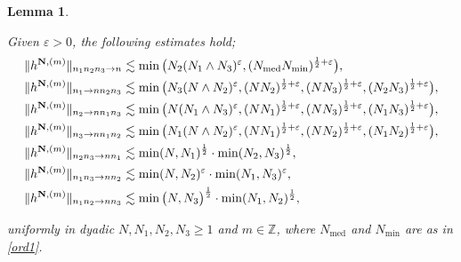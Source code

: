 \documentclass[%
11pt,  reqno]{amsart}
\newtheorem{lemma}[theorem]{Lemma}
\DeclareMathOperator{\med}{med}
\newcommand{\1}{\hspace{0.2mm}\text{I}\hspace{0.2mm}}
\newcommand{\noi}{\noindent}
\newcommand{\Z}{\mathbb{Z}}
\newcommand{\eps}{\varepsilon}
\numberwithin{equation}{section}
\numberwithin{theorem}{section}
\begin{document}
\begin{lemma}
\label{LEM:basetensor}



Given $\eps > 0$, the following estimates hold\textup{;}
\begin{align}
\|h^{{\bf N},(m)} \|_{n_1 n_2 n_3 \to n} &\lesssim  \min \big(N_2 (N_1\wedge N_3)^{\eps}, (N_{\med}N_{\min})^{\frac12 +\eps}\big), 
\notag \\
\|h^{{\bf N},(m)} \|_{n_1 \to n n_2n_3  } 
&\lesssim  \min \big(N_3 (N\wedge N_2)^{\eps}, (NN_2)^{\frac12+\eps}, (N N_3)^{\frac12+\eps}, (N_2 N_3)^{\frac12+\eps}\big), 
\notag \\
\|h^{{\bf N},(m)} \|_{ n_2 \to n n_1n_3 } &\lesssim  \min \big(N (N_1\wedge N_3)^{\eps}, 
(N N_1)^{\frac12+\eps}, (N N_3)^{\frac12+\eps}, 
(N_1N_3)^{\frac12+\eps}\big), 
\notag \\
\|h^{{\bf N},(m)} \|_{n_3 \to n n_1n_2} &\lesssim \min 
\big( N_1 (N\wedge N_2)^{\eps}, (N N_1)^{\frac12+\eps},
(N N_2)^{\frac12+\eps},
 (N_1 N_2)^{\frac12+\eps}\big), 
\label{base1}\\
\|h^{{\bf N},(m)} \|_{ n_2n_3\to nn_1} 
& \lesssim    \min (N, N_1)^{\frac12}
\cdot \min (N_2, N_3)^{\frac12}, 
\notag \\
\|h^{{\bf N},(m)} \|_{n_1n_3 \to nn_2} 
&\lesssim  
 \min (N, N_2)^{\eps}\cdot 
\min (N_1, N_3)^{\eps},  
\notag \\
\|h^{{\bf N},(m)} \|_{n_1n_2\to nn_3} 
&\lesssim 
 \min \big(N, N_3\big)^{\frac 12 }\cdot 
\min (N_1, N_2)^{\frac12}, 
\notag
\end{align}

\noi
uniformly in 
dyadic $N, N_1, N_2, N_3\ge 1$ and $m \in \Z$, 
where 
$N_{\med}$ and $N_{\min}$ are as in 
 \eqref{ord1}.


\end{lemma}
\end{document}
